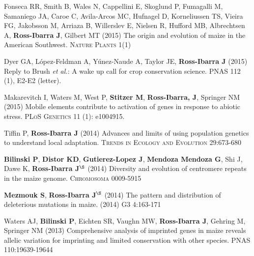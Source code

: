 \documentclass[letterpaper]{article}
\begin{document}
\begin{etaremune}
\vspace{-2ex}
\item Fonseca RR, Smith B, Wales N, Cappellini E, Skoglund P, Fumagalli M, Samaniego JA, Caroe C, Avila-Arcos MC, Hufnagel D, Korneliussen TS, Vieira FG, Jakobsson M, Arriaza B, Willerslev E, Nielsen R, Hufford MB, Albrechtsen A,  {\bf Ross-Ibarra J}, Gilbert MT (2015) The origin and evolution of maize in the American Southwest. \textsc{Nature Plants} 1(1)

\vspace{-2ex}
\item Dyer GA, L\'opez-Feldman A, Y\'unez-Naude A, Taylor JE, {\bf Ross-Ibarra J} (2015) Reply to Brush \emph{et al.}: A wake up call for crop conservation science. PNAS 112 (1), E2-E2 (letter).

\vspace{-2ex}
\item Makarevitch I, Waters M, West P, {\bf Stitzer M}, {\bf Ross-Ibarra, J}, Springer NM (2015) Mobile elements contribute to activation of genes in response to abiotic stress. \textsc{PLoS Genetics} 11 (1): e1004915. %

\vspace{-2ex}
\item Tiffin P, {\bf Ross-Ibarra J} (2014) Advances and limits of using population genetics to understand local adaptation. \textsc{Trends in Ecology and Evolution} 29:673-680 %

\vspace{-2ex}
\item {\bf Bilinski P}, {\bf Distor KD}, {\bf Gutierez-Lopez J}, {\bf Mendoza Mendoza G}, Shi J, Dawe K,  {\bf Ross-Ibarra J}$^\S$ (2014) Diversity and evolution of centromere repeats in the maize genome. \textsc{Chromosoma} 0009-5915

\vspace{-2ex}
\item {\bf Mezmouk S}, {\bf Ross-Ibarra J}$^\S$ (2014) The pattern and distribution of deleterious mutations in maize. (2014) \textsc{G3} 4:163-171

\vspace{-2ex}
\item Waters AJ, {\bf Bilinski P}, Eichten SR, Vaughn MW, {\bf Ross-Ibarra J}, Gehring M, Springer NM (2013) Comprehensive analysis of imprinted genes in maize reveals allelic variation for imprinting and limited conservation with other species. \textsc{PNAS} 110:19639-19644 


\end{etaremune}
\end{document}
